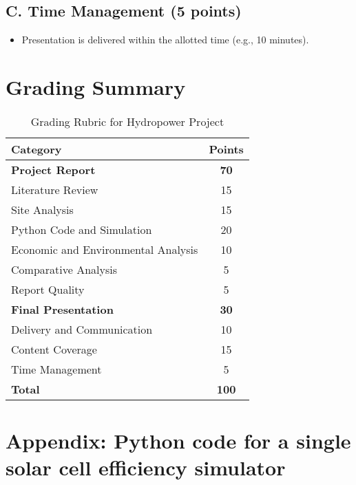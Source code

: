 \documentclass[11pt]{article}
\begin{document}
\subsection*{C. Time Management (5 points)}
\begin{itemize}
    \item Presentation is delivered within the allotted time (e.g., 10 minutes).
\end{itemize}

\section*{Grading Summary}
\begin{table}[h!]
    \centering
    \begin{tabular}{|l|c|}
        \hline
        \textbf{Category} & \textbf{Points} \\
        \hline
        \textbf{Project Report} & \textbf{70} \\
        Literature Review & 15 \\
        Site Analysis & 15 \\
        Python Code and Simulation & 20 \\
        Economic and Environmental Analysis & 10 \\
        Comparative Analysis & 5 \\
        Report Quality & 5 \\
        \hline
        \textbf{Final Presentation} & \textbf{30} \\
        Delivery and Communication & 10 \\
        Content Coverage & 15 \\
        Time Management & 5 \\
        \hline
        \textbf{Total} & \textbf{100} \\
        \hline
    \end{tabular}
    \caption{Grading Rubric for Hydropower Project}
\end{table}


\newpage
\appendix
\section{Appendix: Python code for a single solar cell efficiency simulator}
\end{document}
